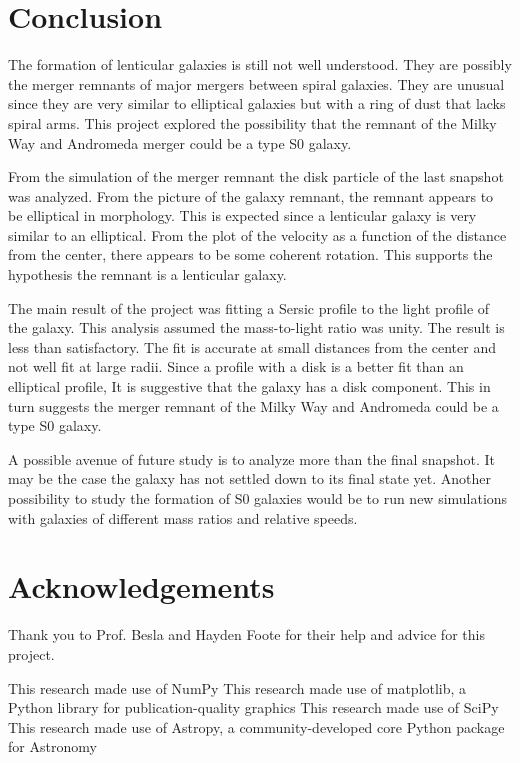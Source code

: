 \documentclass[fleqn,usenatbib]{mnras}
\begin{document}
 \section{Conclusion}
The formation of lenticular galaxies is still not well understood. They are possibly the merger remnants of major mergers between spiral galaxies. They are unusual since they are very similar to elliptical galaxies but with a ring of dust that lacks spiral arms. This project explored the possibility that the remnant of the Milky Way and Andromeda merger could be a type S0 galaxy.

From the simulation of the merger remnant the disk particle of the last snapshot was analyzed. From the picture of the galaxy remnant, the remnant appears to be elliptical in morphology. This is expected since a lenticular galaxy is very similar to an elliptical. From the plot of the velocity as a function of the distance from the center, there appears to be some coherent rotation. This supports the hypothesis the remnant is a lenticular galaxy. 

The main result of the project was fitting a Sersic profile to the light profile of the galaxy. This analysis assumed the mass-to-light ratio was unity. The result is less than satisfactory. The fit is accurate at small distances from the center and not well fit at large radii. Since a profile with a disk is a better fit than an elliptical profile, It is suggestive that the galaxy has a disk component. This in turn suggests the merger remnant of the Milky Way and Andromeda could be a type S0 galaxy.

A possible avenue of future study is to analyze more than the final snapshot. It may be the case the galaxy has not settled down to its final state yet. Another possibility to study the formation of S0 galaxies would be to run new simulations with galaxies of different mass ratios and relative speeds.

 \section{Acknowledgements}
 Thank you to Prof. Besla and Hayden Foote for their help and advice for this project.

 This research made use of NumPy \citep{harris2020array} This research made use of matplotlib, a Python library for publication-quality graphics \citep{Hunter:2007} This research made use of SciPy \citep{Virtanen_2020} This research made use of Astropy, a community-developed core Python package for Astronomy \citep{2018AJ....156..123A, 2013A&A...558A..33A} 
\end{document}
